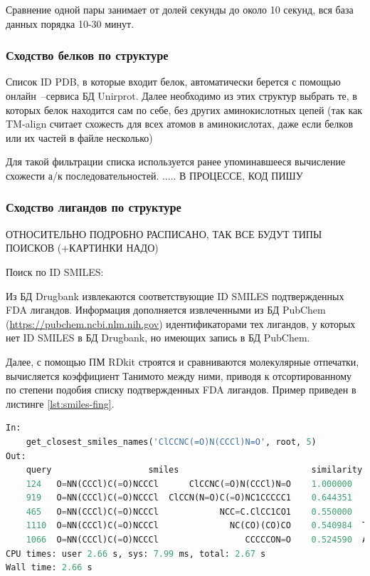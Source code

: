 \documentclass[a4paper,14pt]{article}         %
\begin{document}
Сравнение одной пары занимает от долей секунды до около 10 секунд, вся база данных порядка 10-30 минут.
\subsubsection{Сходство белков по структуре}
Список ID PDB, в которые входит белок, автоматически берется с помощью онлайн~--сервиса БД Unirprot. Далее необходимо из этих структур выбрать те, в которых белок находится сам по себе, без других аминокислотных цепей (так как TM-align считает схожесть для всех атомов в аминокислотах, даже если белков или их частей в файле несколько)

Для такой фильтрации списка используется ранее упоминавшееся вычисление схожести а/к последовательностей. .....
\color{orange} В ПРОЦЕССЕ, КОД ПИШУ
\color{black}
\subsubsection{Сходство лигандов по структуре}
\color{orange} ОТНОСИТЕЛЬНО ПОДРОБНО РАСПИСАНО, ТАК ВСЕ БУДУТ ТИПЫ ПОИСКОВ (+КАРТИНКИ НАДО)
\color{black}

Поиск по ID SMILES:

Из БД Drugbank извлекаются соответствующие ID SMILES подтвержденных FDA лигандов. Информация дополняется извлеченными из БД PubChem (\href{https://pubchem.ncbi.nlm.nih.gov}{https://pubchem.ncbi.nlm.nih.gov}) идентификаторами тех лигандов, у которых нет ID SMILES в БД Drugbank, но имеющих запись в БД PubChem.

Далее, с помощью ПМ RDkit строятся и сравниваются молекулярные отпечатки, вычисляется коэффициент Танимото между ними, приводя к отсортированному по степени подобия списку подтвержденных FDA лигандов. Пример приведен в листинге \ref{lst:smiles-fing}.

\begin{lstlisting}[language=Python, label={lst:smiles-fing}, caption={Сходство лигандов по текстовым молекулярным отпечаткам с помощью ПМ RDkit для входных данных~--- SMILES структуры молекулы.}]
In:
	get_closest_smiles_names('ClCCNC(=O)N(CCCl)N=O', root, 5)
Out:
	query       			smiles  						similarity         			 name
	124   O=NN(CCCl)C(=O)NCCCl      ClCCNC(=O)N(CCCl)N=O    1.000000    Carmustine
	919   O=NN(CCCl)C(=O)NCCCl  ClCCN(N=O)C(=O)NC1CCCCC1    0.644351     Lomustine
	465   O=NN(CCCl)C(=O)NCCCl            NCC=C.ClCC1CO1    0.550000     Sevelamer
	1110  O=NN(CCCl)C(=O)NCCCl              NC(CO)(CO)CO    0.540984  Tromethamine
	1066  O=NN(CCCl)C(=O)NCCCl                 CCCCCON=O    0.524590  Amyl Nitrite
CPU times: user 2.66 s, sys: 7.99 ms, total: 2.67 s
Wall time: 2.66 s
\end{lstlisting}
\end{document}
